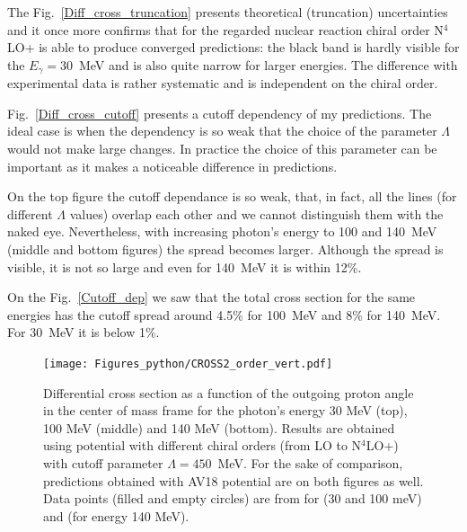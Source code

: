     The Fig.~\ref{Diff_cross_truncation} 
    presents theoretical (truncation) uncertainties and it once more
    confirms that for the regarded nuclear reaction chiral order
    N$^4$LO+ is able to produce converged predictions: 
    the black band is hardly visible for the $E_\gamma=30$~MeV 
    and is also quite narrow for larger energies. 
    The difference with experimental data is rather systematic 
    and is independent on the chiral order. 

    Fig.~\ref{Diff_cross_cutoff} presents a cutoff dependency
    of my predictions. The ideal case is when the dependency is so weak that
    the choice of the parameter $\Lambda$ would not make large 
    changes. In practice the choice of this parameter can be 
    important as it makes a noticeable difference in predictions.
    
    On the top figure the cutoff dependance is so weak,
    that, in fact, all the lines (for different $\Lambda$ values)
    overlap each other and we cannot distinguish them with the naked eye.
    Nevertheless, with increasing photon's energy to 100 and 140~MeV 
    (middle and bottom figures) the spread becomes larger. 
    Although the spread is visible, it is not so large and even for 140~MeV
    it is within 12\%. 

    On the Fig.~\ref{Cutoff_dep} we saw that the total
    cross section for the same energies has the cutoff spread
    around 4.5\% for 100~MeV and 8\% for 140~MeV. For 30~MeV it is below 1\%.  
    

    \begin{figure}[h]
        \begin{center}
        \texttt{[image: Figures\_python/CROSS2\_order\_vert.pdf]}
        \end{center}
        \caption{Differential cross section as a function of the outgoing proton angle in the center of mass frame 
        for the photon's energy 30 MeV (top), 100 MeV (middle) and 140 MeV (bottom). Results are obtained using potential
        with different chiral orders (from LO to N$^4$LO+) with cutoff parameter $\Lambda=450$~MeV.
        For the sake of comparison, predictions obtained with AV18 potential are on both figures as well.
        Data points (filled and empty circles) are from \cite{Ying_Experiment_Deut}
        for (30 and 100 meV)
        and \cite{DeSanctis_Experiment_Deut} (for energy 140 MeV).}
        \label{Diff_cross_order}
    \end{figure}


